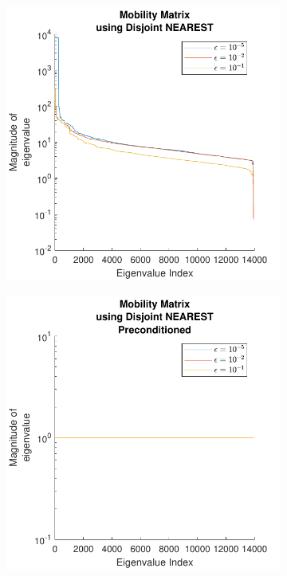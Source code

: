 \begin{figure}
\begin{subfigure}{0.45\textwidth}
    \end{subfigure}
    \begin{subfigure}{0.45\textwidth}
        \centering
        \includegraphics[width=\linewidth]{Images/Condition/Eigen-Mobility Matrix using Disjoint NEAREST.pdf}
    \end{subfigure}
    \hfill
    \begin{subfigure}{0.45\textwidth}
        \centering
        \includegraphics[width=\linewidth]{Images/Condition/Eigen-Mobility Matrix using Disjoint NEAREST Preconditioned.pdf}
    \end{subfigure}
\end{figure}



